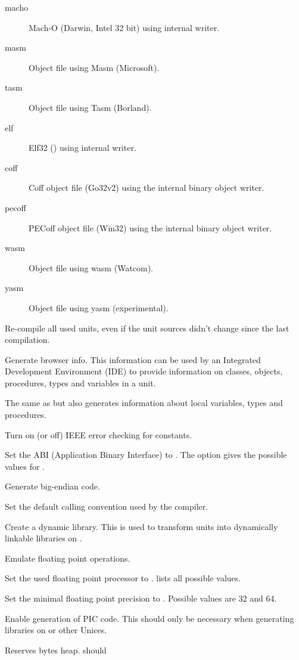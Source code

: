 \begin{description}
\begin{description}
\item[macho]    Mach-O (Darwin, Intel 32 bit) using internal writer.
\item[masm] Object file using Masm (Microsoft).
\item[tasm] Object file using Tasm (Borland).
\item[elf] Elf32 (\linux) using internal writer.
\item[coff] Coff object file (Go32v2) using the internal binary object writer.
\item[pecoff] PECoff object file (Win32) using the internal binary object writer.
\item[wasm] Object file using wasm (Watcom).
\item[yasm] Object file using yasm (experimental).
\end{description}
\item[-B]  Re-compile all used units, even
if the unit sources didn't change since the last compilation.
\item[-b]  Generate browser info. This information can
be used by an Integrated Development Environment (IDE) to provide information
on classes, objects, procedures, types  and variables in a unit.
\item[-bl]  The same as  but also generates
information about local variables, types and procedures.
\item[-C3] Turn on (or off) IEEE error checking for constants.
\item[-Caxxx] Set the ABI (Application Binary Interface) to . 
The  option gives the possible values  for .
\item[-Cb] Generate big-endian code.
\item[-Cc] Set the default calling convention used by the compiler.
\item [-CD] Create a dynamic library. This is used to transform units into
dynamically linkable libraries on \linux.
\item[-Ce] Emulate floating point operations.
\item[-Cfxxx] Set the used floating point processor to .  lists all possible values.
\item[-CFNN] Set the minimal floating point precision to . Possible
values are 32 and 64.
\item[-Cg] Enable generation of PIC code. This should only be necessary when
generating libraries on \linux or other Unices. 
\item [-Chxxx]  Reserves  bytes heap.  should

\end{description}
